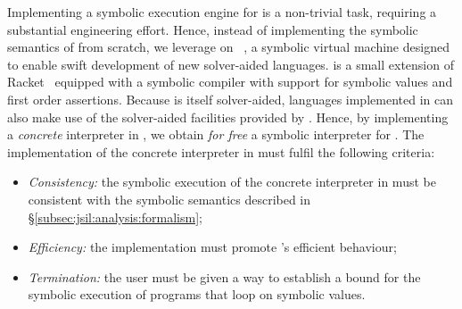 Implementing a symbolic execution engine for \jsil is a non-trivial 
task, requiring a substantial engineering effort. 
%
%
% 
Hence, instead of implementing the symbolic semantics of \jsil from scratch, we leverage on 
\rosette~\cite{Rosette1,Rosette2}, a symbolic virtual machine designed to 
enable swift development of new 
solver-aided languages. 
%
\rosette is a small extension of Racket~\cite{racket} equipped with a symbolic compiler with support 
for symbolic values and first order assertions. Because \rosette is itself solver-aided, languages 
implemented in \rosette can also make use of the solver-aided facilities provided by \rosette. 
Hence, by implementing a \emph{concrete} \jsil interpreter in \rosette, we obtain \emph{for free} a symbolic 
interpreter for \jsil. %
%
The implementation of the concrete interpreter in \rosette must fulfil the following criteria:
\begin{itemize}
   \item \emph{Consistency:} the symbolic execution of the concrete interpreter in \rosette 
            must be consistent with the symbolic semantics described in \S\ref{subsec:jsil:analysis:formalism}; 
            
   \item \emph{Efficiency:} the implementation must promote \rosette's efficient behaviour;
   
   \item \emph{Termination:} the user must be given a way to establish a bound for the symbolic execution 
            of programs that loop on symbolic values.
\end{itemize}


